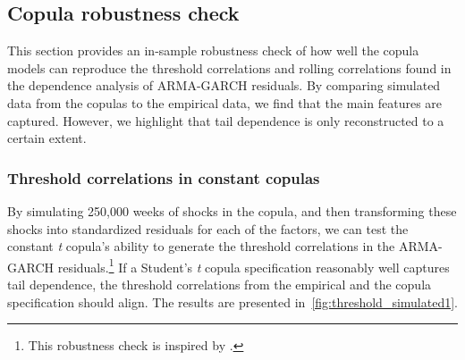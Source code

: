 \subsection{Copula robustness check}
\label{sub:05_robust}

This section provides an in-sample robustness check of how well the copula models can reproduce the threshold correlations and rolling correlations found in the dependence analysis of ARMA-GARCH residuals. By comparing simulated data from the copulas to the empirical data, we find that the main features are captured. However, we highlight that tail dependence is only reconstructed to a certain extent.

\subsubsection{Threshold correlations in constant copulas}
By simulating 250,000 weeks of shocks in the copula, and then transforming these shocks into standardized residuals for each of the factors, we can test the constant \textit{t} copula's ability to generate the threshold correlations in the ARMA-GARCH residuals.\footnote{This robustness check is inspired by \textcite{ChristoffersenLanglois2013}.} If a Student's \textit{t} copula specification reasonably well captures tail dependence, the threshold correlations from the empirical and the copula specification should align. The results are presented in~\autoref{fig:threshold_simulated1}.

